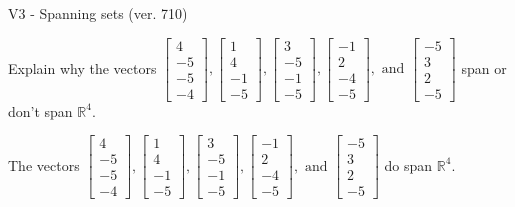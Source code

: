 \begin{exercise}
  \begin{exerciseTitle}V3 - Spanning sets (ver. 710)\end{exerciseTitle}
  \begin{exerciseStatement}
    Explain why the vectors \(\left[\begin{array}{r}
4 \\
-5 \\
-5 \\
-4
\end{array}\right] , \left[\begin{array}{r}
1 \\
4 \\
-1 \\
-5
\end{array}\right] , \left[\begin{array}{r}
3 \\
-5 \\
-1 \\
-5
\end{array}\right] , \left[\begin{array}{r}
-1 \\
2 \\
-4 \\
-5
\end{array}\right] , \text{ and } \left[\begin{array}{r}
-5 \\
3 \\
2 \\
-5
\end{array}\right]\) span or don't span \(\mathbb{R}^4\). 
	


  \end{exerciseStatement}
  \begin{exerciseAnswer}
   The vectors \(\left[\begin{array}{r}
4 \\
-5 \\
-5 \\
-4
\end{array}\right] , \left[\begin{array}{r}
1 \\
4 \\
-1 \\
-5
\end{array}\right] , \left[\begin{array}{r}
3 \\
-5 \\
-1 \\
-5
\end{array}\right] , \left[\begin{array}{r}
-1 \\
2 \\
-4 \\
-5
\end{array}\right] , \text{ and } \left[\begin{array}{r}
-5 \\
3 \\
2 \\
-5
\end{array}\right]\) 
  	 do  
	span \(\mathbb{R}^4\).
  



\end{exerciseAnswer}
\end{exercise}
